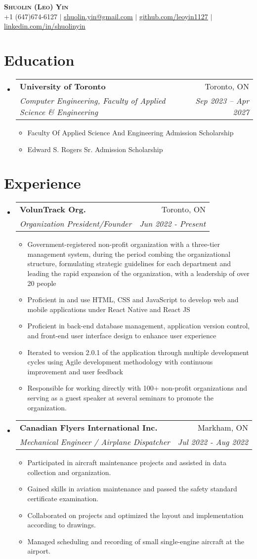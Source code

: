 \documentclass[letterpaper,11pt]{article}
\makeatletter
\newcommand{\resumeItem}[1]{
  \item\small{
    {#1 \vspace{-5pt}}
  }
}
\newcommand{\resumeSubheading}[4]{
  \vspace{-2pt}\item
    \begin{tabular*}{0.97\textwidth}[t]{l@{\extracolsep{\fill}}r}
      \textbf{#1} & #2 \\
      \textit{\small#3} & \textit{\small #4} \\
    \end{tabular*}\vspace{-7pt}
}
\newcommand{\resumeSubHeadingListStart}{\begin{itemize}[leftmargin=0.15in, label={}]}
\newcommand{\resumeSubHeadingListEnd}{\end{itemize}}
\newcommand{\resumeItemListStart}{\begin{itemize}}
\newcommand{\resumeItemListEnd}{\end{itemize}\vspace{-5pt}}
\makeatother
\begin{document}
\begin{center}
    \textbf{\Huge \scshape Shuolin (Leo) Yin} \\ \vspace{1pt}
    \small +1 (647)674-6127 $|$ \href{mailto:shuolin.yin@gmail.com}{\underline{shuolin.yin@gmail.com}} $|$ 
    \href{https://github.com/leoyin1127}{\underline{github.com/leoyin1127}} $|$
    \href{https://www.linkedin.com/in/shuolinyin/}{\underline{linkedin.com/in/shuolinyin}}
\end{center}

\section{Education}
\resumeSubHeadingListStart
  \resumeSubheading
  {University of Toronto}{Toronto, ON}
  {Computer Engineering, Faculty of Applied Science \& Engineering}{Sep 2023 -- Apr 2027}
  \resumeItemListStart
    \resumeItem{Faculty Of Applied Science And Engineering Admission Scholarship}
    \resumeItem{Edward S. Rogers Sr. Admission Scholarship}
  \resumeItemListEnd
\resumeSubHeadingListEnd

\section{Experience}
\resumeSubHeadingListStart
  \resumeSubheading
  {VolunTrack Org.}{Toronto, ON}
  {Organization President/Founder}{Jun 2022 - Present}
  \resumeItemListStart
    \resumeItem{Government-registered non-profit organization with a three-tier management system, during the period combing the organizational structure, formulating strategic guidelines for each department and leading the rapid expansion of the organization, with a leadership of over 20 people}
    \resumeItem{Proficient in and use HTML, CSS and JavaScript to develop web and mobile applications under React Native and React JS}
    \resumeItem{Proficient in back-end database management, application version control, and front-end user interface design to enhance user experience}
    \resumeItem{Iterated to version 2.0.1 of the application through multiple development cycles using Agile development methodology with continuous improvement and user feedback}
    \resumeItem{Responsible for working directly with 100+ non-profit organizations and serving as a guest speaker at several seminars to promote the organization.}
  \resumeItemListEnd

  \resumeSubheading
  {Canadian Flyers International Inc.}{Markham, ON}
  {Mechanical Engineer / Airplane Dispatcher}{Jul 2022 - Aug 2022}
  \resumeItemListStart
    \resumeItem{Participated in aircraft maintenance projects and assisted in data collection and organization.}
    \resumeItem{Gained skills in aviation maintenance and passed the safety standard certificate examination.}
    \resumeItem{Collaborated on projects and optimized the layout and implementation according to drawings.}
    \resumeItem{Managed scheduling and recording of small single-engine aircraft at the airport.}
  \resumeItemListEnd
\resumeSubHeadingListEnd
\end{document}
